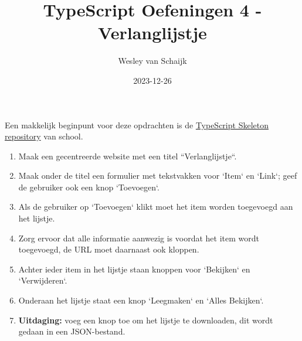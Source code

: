 \documentclass{article}
\title{TypeScript Oefeningen 4 - Verlanglijstje}
\author{Wesley van Schaijk}
\date{2023-12-26}
\begin{document}
\maketitle

\paragraph{}
Een makkelijk beginpunt voor deze opdrachten is de \href{https://github.com/HZ-HBO-ICT/ts-skeleton-app}{TypeScript Skeleton repository} van school.

\begin{enumerate}
	\item Maak een gecentreerde website met een titel ``Verlanglijstje``.
	\item Maak onder de titel een formulier met tekstvakken voor `Item` en `Link`; geef de gebruiker ook een knop `Toevoegen`.
	\item Als de gebruiker op `Toevoegen` klikt moet het item worden toegevoegd aan het lijstje.
	\item Zorg ervoor dat alle informatie aanwezig is voordat het item wordt toegevoegd, de URL moet daarnaast ook kloppen.
	\item Achter ieder item in het lijstje staan knoppen voor `Bekijken` en `Verwijderen`.
	\item Onderaan het lijstje staat een knop `Leegmaken` en `Alles Bekijken`.
	\item \textbf{Uitdaging:} voeg een knop toe om het lijstje te downloaden, dit wordt gedaan in een JSON-bestand.
\end{enumerate}
\end{document}
